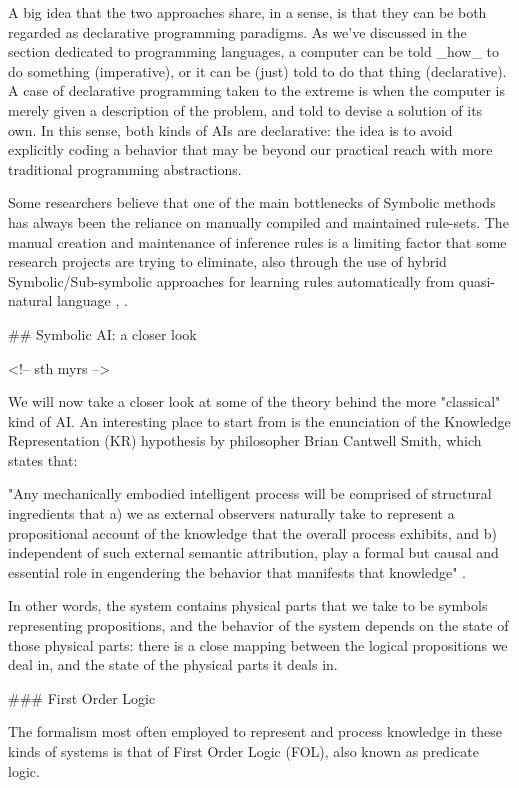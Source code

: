A big idea that the two approaches share, in a sense, is that they can be both regarded as declarative programming paradigms. As we've discussed in the section dedicated to programming languages, a computer can be told _how_ to do something (imperative), or it can be (just) told to do that thing (declarative). A case of declarative programming taken to the extreme is when the computer is merely given a description of the problem, and told to devise a solution of its own. In this sense, both kinds of AIs are declarative: the idea is to avoid explicitly coding a behavior that may be beyond our practical reach with more traditional programming abstractions.

Some researchers believe that one of the main bottlenecks of Symbolic methods has always been the reliance on manually compiled and maintained rule-sets. The manual creation and maintenance of inference rules is a limiting factor that some research projects are trying to eliminate, also through the use of hybrid Symbolic/Sub-symbolic approaches for learning rules automatically from quasi-natural language \cite{ilkou2020symbolic}, \cite{yang2021learning}.

## Symbolic AI: a closer look

<!-- sth myrs -->

We will now take a closer look at some of the theory behind the more "classical" kind of AI. An interesting place to start from is the enunciation of the Knowledge Representation (KR) hypothesis by philosopher Brian Cantwell Smith, which states that:

"Any mechanically embodied intelligent process will be comprised of
structural ingredients that a) we as external observers naturally take to
represent a propositional account of the knowledge that the overall
process exhibits, and b) independent of such external semantic attribution, play a formal but causal and essential role in engendering
the behavior that manifests that knowledge" \cite{brachman2022machines}.

In other words, the system contains physical parts that we take to be symbols representing propositions, and the behavior of the system depends on the state of those physical parts: there is a close mapping between the logical propositions we deal in, and the state of the physical parts it deals in.

### First Order Logic

The formalism most often employed to represent and process knowledge in these kinds of systems is that of First Order Logic (FOL), also known as predicate logic.

